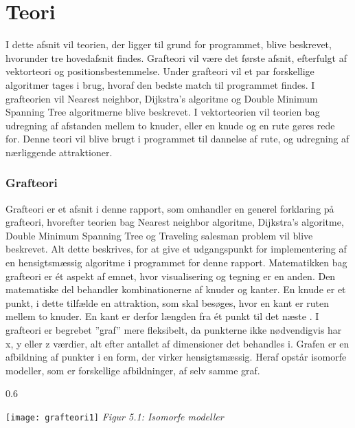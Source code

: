 \chapter{Teori}
I dette afsnit vil teorien, der ligger til grund for programmet, blive beskrevet, hvorunder tre hovedafsnit findes. Grafteori vil være det første afsnit, efterfulgt af vektorteori og  positionsbestemmelse. Under grafteori vil et par forskellige algoritmer tages i brug, hvoraf den bedste match til programmet findes. I grafteorien vil Nearest neighbor, Dijkstra’s algoritme og Double Minimum Spanning Tree algoritmerne blive beskrevet. I vektorteorien vil teorien bag udregning af afstanden mellem to knuder, eller en knude og en rute gøres rede for. Denne teori vil blive brugt i programmet til dannelse af rute, og udregning af nærliggende attraktioner.

\subsection{Grafteori}
Grafteori er et afsnit i denne rapport, som omhandler en generel forklaring på grafteori, hvorefter teorien bag Nearest neighbor algoritme, Dijkstra’s algoritme, Double Minimum Spanning Tree og Traveling salesman problem vil blive beskrevet. Alt dette beskrives, for at give et udgangspunkt for implementering af en hensigtsmæssig algoritme i programmet for denne rapport.\newline
Matematikken bag grafteori er ét aspekt af emnet, hvor visualisering og tegning er en anden. Den matematiske del behandler kombinationerne af knuder og kanter. En knude er et punkt, i dette tilfælde en attraktion, som skal besøges, hvor en kant er ruten mellem to knuder. En kant er derfor længden fra ét punkt til det næste \citep{GraphTheory}.
I grafteori er begrebet ”graf” mere fleksibelt, da punkterne ikke nødvendigvis har x, y eller z værdier, alt efter antallet af dimensioner det behandles i. Grafen er en afbildning af punkter i en form, der virker hensigtsmæssig. Heraf opstår isomorfe modeller, som er forskellige afbildninger, af selv samme graf. 

\begin{wrapfigure}{}{0.6\textwidth}
	\vspace{-20pt}
	\begin{center}
		\texttt{[image: grafteori1]} \newline
		\textit{Figur 5.1: Isomorfe modeller}\newline
	\end{center}
	\vspace{-20pt}
	\vspace{-20pt}
\end{wrapfigure}

